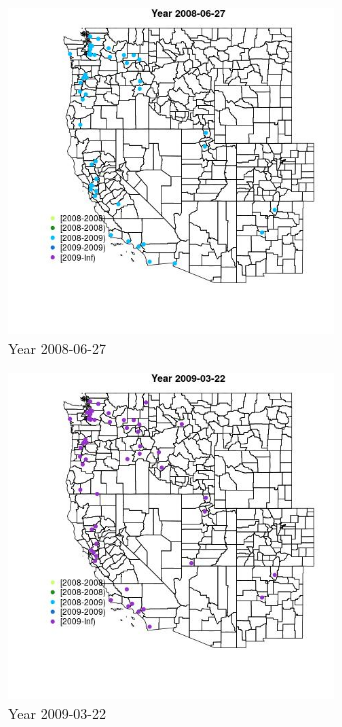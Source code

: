 \begin{figure} 
\centering  
\includegraphics[width=0.77\textwidth]{Code_Outputs/Report_ML_input_PM25_Step4_part_e_de_duplicated_aves_MapObsYear2008-06-27.jpg} 
\caption{\label{fig:Report_ML_input_PM25_Step4_part_e_de_duplicated_avesMapObsYear2008-06-27}Year 2008-06-27} 
\end{figure} 
 

\begin{figure} 
\centering  
\includegraphics[width=0.77\textwidth]{Code_Outputs/Report_ML_input_PM25_Step4_part_e_de_duplicated_aves_MapObsYear2009-03-22.jpg} 
\caption{\label{fig:Report_ML_input_PM25_Step4_part_e_de_duplicated_avesMapObsYear2009-03-22}Year 2009-03-22} 
\end{figure} 
 

